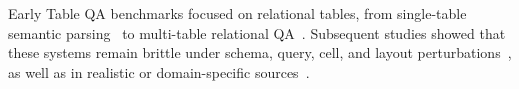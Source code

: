 


Early Table QA benchmarks focused on relational tables, from single-table semantic parsing~\cite{1.4} to multi-table relational QA~\cite{1.6,1.19,1.20,1.30}. Subsequent studies showed that these systems remain brittle under schema, query, cell, and layout perturbations~\cite{2.4,2.5,2.6,2.8,2.9,2.10}, as well as in realistic or domain-specific sources~\cite{2.7,5.7}.

